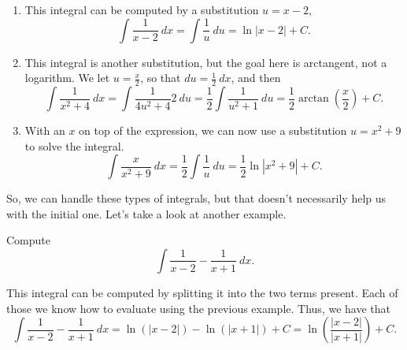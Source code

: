 \documentclass{ximera}
\begin{document}
\begin{exampleSol}
    \begin{enumerate}
        \item This integral can be computed by a substitution $u = x-2$,
            \begin{equation*}
                \int \frac{1}{x-2}\ dx = \int \frac{1}{u}\ du = \ln|x-2| + C.
            \end{equation*}
        \item This integral is another substitution, but the goal here is arctangent, not a logarithm. We let $u = \frac{x}{2}$, so that $du = \frac{1}{2}\ dx$, and then 
            \begin{equation*}
                \int \frac{1}{x^2 + 4}\ dx = \int \frac{1}{4u^2 + 4} 2\ du = \frac{1}{2} \int \frac{1}{u^2 + 1}\ du = \frac{1}{2} \arctan\left( \frac{x}{2} \right) + C.
            \end{equation*}
        \item With an $x$ on top of the expression, we can now use a substitution $u = x^2 + 9$ to solve the integral.
            \begin{equation*}
                \int \frac{x}{x^2 + 9}\ dx = \frac{1}{2} \int \frac{1}{u}\ du = \frac{1}{2} \ln|x^2 + 9| + C.
            \end{equation*}
    \end{enumerate}
\end{exampleSol}

So, we can handle these types of integrals, but that doesn't necessarily help us with the initial one. Let's take a look at another example.

\begin{example}
    Compute 
    \begin{equation*}
        \int \frac{1}{x-2} - \frac{1}{x+1}\ dx.
    \end{equation*}
\end{example}

\begin{exampleSol}
    This integral can be computed by splitting it into the two terms present. Each of those we know how to evaluate using the previous example. Thus, we have that
    \begin{equation*}
        \int \frac{1}{x-2} - \frac{1}{x+1}\ dx = \ln(|x-2|) - \ln(|x+1|) + C = \ln\left(\frac{|x-2|}{|x+1|}\right) + C.
    \end{equation*}
\end{exampleSol}
\end{document}
